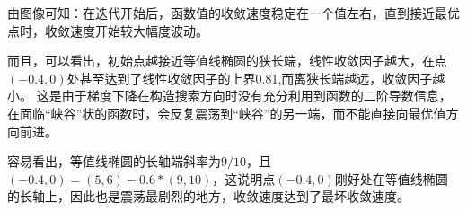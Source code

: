 由图像可知：在迭代开始后，函数值的收敛速度稳定在一个值左右，直到接近最优点时，收敛速度开始较大幅度波动。

而且，可以看出，初始点越接近等值线椭圆的狭长端，线性收敛因子越大，在点$(-0.4,0)$处甚至达到了线性收敛因子的上界0.81,而离狭长端越远，收敛因子越小。
这是由于梯度下降在构造搜索方向时没有充分利用到函数的二阶导数信息，在面临“峡谷”状的函数时，会反复震荡到“峡谷”的另一端，而不能直接向最优值方向前进。

容易看出，等值线椭圆的长轴端斜率为$9/10$，且$(-0.4,0)=(5,6)-0.6*(9,10)$，这说明点$(-0.4,0)$刚好处在等值线椭圆的长轴上，因此也是震荡最剧烈的地方，收敛速度达到了最坏收敛速度。